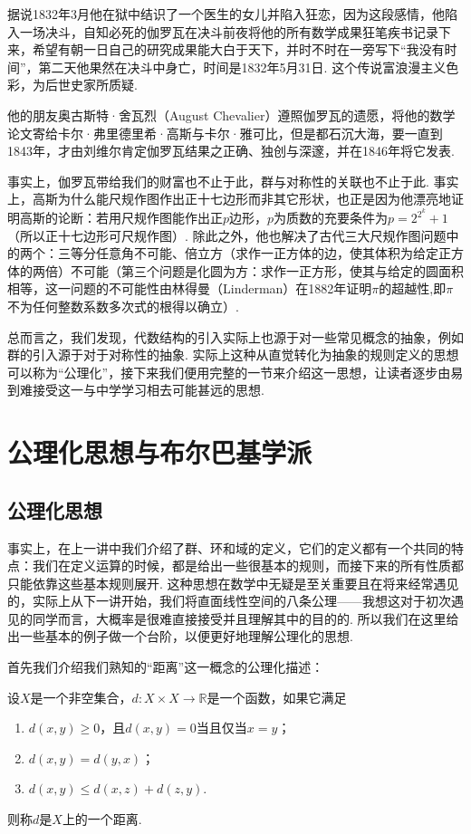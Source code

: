 据说1832年3月他在狱中结识了一个医生的女儿并陷入狂恋，因为这段感情，他陷入一场决斗，自知必死的伽罗瓦在决斗前夜将他的所有数学成果狂笔疾书记录下来，希望有朝一日自己的研究成果能大白于天下，并时不时在一旁写下“我没有时间”，第二天他果然在决斗中身亡，时间是1832年5月31日. 这个传说富浪漫主义色彩，为后世史家所质疑.

他的朋友奥古斯特·舍瓦烈（August Chevalier）遵照伽罗瓦的遗愿，将他的数学论文寄给卡尔·弗里德里希·高斯与卡尔·雅可比，但是都石沉大海，要一直到1843年，才由刘维尔肯定伽罗瓦结果之正确、独创与深邃，并在1846年将它发表.

事实上，伽罗瓦带给我们的财富也不止于此，群与对称性的关联也不止于此. 事实上，高斯为什么能尺规作图作出正十七边形而非其它形状，也正是因为他漂亮地证明高斯的论断：若用尺规作图能作出正$p$边形，$p$为质数的充要条件为$p=2^{2^k}+1$（所以正十七边形可尺规作图）. 除此之外，他也解决了古代三大尺规作图问题中的两个：三等分任意角不可能、倍立方（求作一正方体的边，使其体积为给定正方体的两倍）不可能（第三个问题是化圆为方：求作一正方形，使其与给定的圆面积相等，这一问题的不可能性由林得曼（Linderman）在1882年证明$\pi$的超越性,即$\pi$不为任何整数系数多次式的根得以确立）.

总而言之，我们发现，代数结构的引入实际上也源于对一些常见概念的抽象，例如群的引入源于对于对称性的抽象. 实际上这种从直觉转化为抽象的规则定义的思想可以称为``公理化''，接下来我们便用完整的一节来介绍这一思想，让读者逐步由易到难接受这一与中学学习相去可能甚远的思想.

\section*{公理化思想与布尔巴基学派}

\subsection*{公理化思想}
事实上，在上一讲中我们介绍了群、环和域的定义，它们的定义都有一个共同的特点：我们在定义运算的时候，都是给出一些很基本的规则，而接下来的所有性质都只能依靠这些基本规则展开. 这种思想在数学中无疑是至关重要且在将来经常遇见的，实际上从下一讲开始，我们将直面线性空间的八条公理——我想这对于初次遇见的同学而言，大概率是很难直接接受并且理解其中的目的的. 所以我们在这里给出一些基本的例子做一个台阶，以便更好地理解公理化的思想.

首先我们介绍我们熟知的``距离''这一概念的公理化描述：
\begin{definition*}
    设$X$是一个非空集合，$d:X\times X\to \mathbb{R}$是一个函数，如果它满足
    \begin{enumerate}
        \item $d(x,y)\geq 0$，且$d(x,y)=0$当且仅当$x=y$；
        \item $d(x,y)=d(y,x)$；
        \item $d(x,y)\leq d(x,z)+d(z,y)$.
    \end{enumerate}
    则称$d$是$X$上的一个距离.
\end{definition*}

